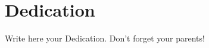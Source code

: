 \documentclass[../Main_PhD_Dissertation.tex]{subfiles}
\begin{document}
	\chapter*{Dedication}
	
Write here your Dedication. Don't forget your parents! 
	
	
\end{document}
